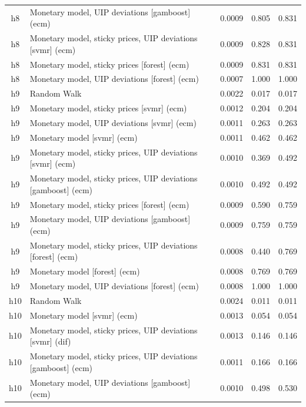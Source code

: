 \begin{ThreePartTable}
\begin{longtable}[t]{cp{5.5cm}ccc}
h8 & \raggedright Monetary model, UIP deviations [gamboost] (ecm) & 0.0009 & 0.805 & 0.831\\
h8 & \raggedright Monetary model, sticky prices, UIP deviations [svmr] (ecm) & 0.0009 & 0.828 & 0.831\\
h8 & \raggedright Monetary model, sticky prices [forest] (ecm) & 0.0009 & 0.831 & 0.831\\
h8 & \raggedright Monetary model, UIP deviations [forest] (ecm) & 0.0007 & 1.000 & 1.000\\
\addlinespace
h9 & \raggedright Random Walk & 0.0022 & 0.017 & 0.017\\
h9 & \raggedright Monetary model, sticky prices [svmr] (ecm) & 0.0012 & 0.204 & 0.204\\
h9 & \raggedright Monetary model, UIP deviations [svmr] (ecm) & 0.0011 & 0.263 & 0.263\\
h9 & \raggedright Monetary model [svmr] (ecm) & 0.0011 & 0.462 & 0.462\\
h9 & \raggedright Monetary model, sticky prices, UIP deviations [svmr] (ecm) & 0.0010 & 0.369 & 0.492\\
h9 & \raggedright Monetary model, sticky prices, UIP deviations [gamboost] (ecm) & 0.0010 & 0.492 & 0.492\\
h9 & \raggedright Monetary model, sticky prices [forest] (ecm) & 0.0009 & 0.590 & 0.759\\
h9 & \raggedright Monetary model, UIP deviations [gamboost] (ecm) & 0.0009 & 0.759 & 0.759\\
h9 & \raggedright Monetary model, sticky prices, UIP deviations [forest] (ecm) & 0.0008 & 0.440 & 0.769\\
h9 & \raggedright Monetary model [forest] (ecm) & 0.0008 & 0.769 & 0.769\\
h9 & \raggedright Monetary model, UIP deviations [forest] (ecm) & 0.0008 & 1.000 & 1.000\\
\addlinespace
h10 & \raggedright Random Walk & 0.0024 & 0.011 & 0.011\\
h10 & \raggedright Monetary model [svmr] (ecm) & 0.0013 & 0.054 & 0.054\\
h10 & \raggedright Monetary model, sticky prices, UIP deviations [svmr] (dif) & 0.0013 & 0.146 & 0.146\\
h10 & \raggedright Monetary model, sticky prices, UIP deviations [gamboost] (ecm) & 0.0011 & 0.166 & 0.166\\
h10 & \raggedright Monetary model, UIP deviations [gamboost] (ecm) & 0.0010 & 0.498 & 0.530\\

\end{longtable}
\end{ThreePartTable}
